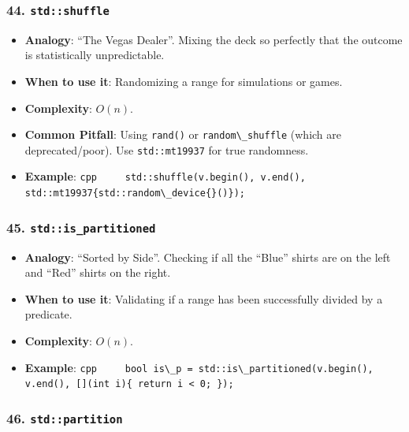 \hypertarget{stdshuffle}{%
\subsubsection{\texorpdfstring{44.
\texttt{std::shuffle}}{44. std::shuffle}}\label{stdshuffle}}

\begin{itemize}
\tightlist
\item
  \textbf{Analogy}: ``The Vegas Dealer''. Mixing the deck so perfectly
  that the outcome is statistically unpredictable.
\item
  \textbf{When to use it}: Randomizing a range for simulations or games.
\item
  \textbf{Complexity}: \(O(n)\).
\item
  \textbf{Common Pitfall}: Using \passthrough{\lstinline!rand()!} or
  \passthrough{\lstinline!random\_shuffle!} (which are deprecated/poor).
  Use \passthrough{\lstinline!std::mt19937!} for true randomness.
\item
  \textbf{Example}:
  \passthrough{\lstinline!cpp     std::shuffle(v.begin(), v.end(), std::mt19937\{std::random\_device\{\}()\});!}
\end{itemize}

\hypertarget{stdis_partitioned}{%
\subsubsection{\texorpdfstring{45.
\texttt{std::is\_partitioned}}{45. std::is\_partitioned}}\label{stdis_partitioned}}

\begin{itemize}
\tightlist
\item
  \textbf{Analogy}: ``Sorted by Side''. Checking if all the ``Blue''
  shirts are on the left and ``Red'' shirts on the right.
\item
  \textbf{When to use it}: Validating if a range has been successfully
  divided by a predicate.
\item
  \textbf{Complexity}: \(O(n)\).
\item
  \textbf{Example}:
  \passthrough{\lstinline!cpp     bool is\_p = std::is\_partitioned(v.begin(), v.end(), [](int i)\{ return i < 0; \});!}
\end{itemize}

\hypertarget{stdpartition}{%
\subsubsection{\texorpdfstring{46.
\texttt{std::partition}}{46. std::partition}}\label{stdpartition}}

